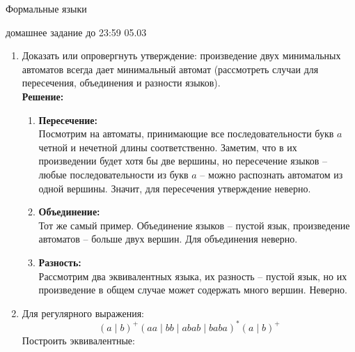 \documentclass[12pt]{article}
\newenvironment{myauto}[1][3]
{
  \begin{center}
    \begin{tikzpicture}[> = stealth,node distance=#1cm, on grid, very thick]
}
{
    \end{tikzpicture}
  \end{center}
}
\begin{document}
\begin{center} {\LARGE Формальные языки} \end{center}

\begin{center} \Large домашнее задание до 23:59 05.03 \end{center}
\bigskip

\begin{enumerate}
  \item Доказать или опровергнуть утверждение: произведение двух минимальных автоматов всегда дает минимальный автомат (рассмотреть случаи для пересечения, объединения и разности языков). \\
  \textbf{Решение:} \\
  \begin{enumerate}
    \item
    \textbf{Пересечение:} \\
    Посмотрим на автоматы, принимающие все последовательности букв $a$ четной и нечетной длины соответственно. Заметим, что в их произведении будет хотя бы две вершины, но пересечение языков -- любые последовательности из букв $a$ -- можно распознать автоматом из одной вершины. Значит, для пересечения утверждение неверно. 
    \item
    \textbf{Объединение:} \\
    Тот же самый пример. Объединение языков -- пустой язык, произведение автоматов -- больше двух вершин. Для объединения неверно.
    \item
    \textbf{Разность:} \\
    Рассмотрим два эквивалентных языка, их разность -- пустой язык, но их произведение в общем случае может содержать много вершин. Неверно.
  \end{enumerate}



  \item Для регулярного выражения:
   \[ (a \mid b)^+ (aa \mid bb \mid abab \mid baba)^* (a \mid b)^+\]
  Построить эквивалентные:
\end{enumerate}
\end{document}
